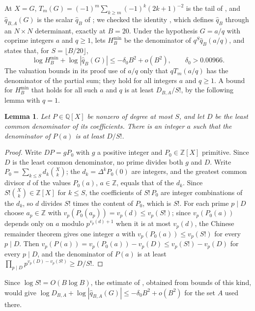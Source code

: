 \documentclass[11pt]{article}
\newtheorem{lemma}[theorem]{Lemma}
\theoremstyle{definition}
\begin{document}
At $X=G$, $T_m(G)=(-1)^m\sum_{k\ge m}(-1)^k(2k+1)^{-2}$ is the tail of \cite[(1.1)]{Sun}, and $\hat q_{B,A}(G)$ is the scalar $\hat q_B$ of \cite[(3.5)]{Sun}; we checked the identity \cite[Proposition~3.1]{Sun}, which defines $\hat q_B$ through an $N\times N$ determinant, exactly at $B=20$. Under the hypothesis $G=a/q$ with coprime integers $a$ and $q\ge1$, \cite[Definition~3.1]{Sun} lets $H_B^{\min}$ be the denominator of $q^S\hat q_B(a/q)$, and \cite[Theorem~9.1]{Sun} states that, for $S=\lfloor B/20\rfloor$,
\[
\log H_B^{\min}+\log|\hat q_B(G)|\le-\delta_0B^2+o(B^2),\qquad\delta_0>0.00966 .
\]
The valuation bounds in its proof \cite[Lemma~5.3]{Sun} use of $a/q$ only that $qT_m(a/q)$ has the denominator of the partial sum; they hold for all integers $a$ and $q\ge1$. A bound for $H_B^{\min}$ that holds for all such $a$ and $q$ is at least $D_{B,A}/S!$, by the following lemma with $q=1$.

\begin{lemma}\label{lem:sunfix}
Let $P\in\mathbb Q[X]$ be nonzero of degree at most $S$, and let $D$ be the least common denominator of its coefficients. There is an integer $a$ such that the denominator of $P(a)$ is at least $D/S!$.
\end{lemma}

\begin{proof}
Write $DP=gP_0$ with $g$ a positive integer and $P_0\in\mathbb Z[X]$ primitive. Since $D$ is the least common denominator, no prime divides both $g$ and $D$. Write $P_0=\sum_{k\le S}d_k\binom Xk$; the $d_k=\Delta^kP_0(0)$ are integers, and the greatest common divisor $d$ of the values $P_0(a)$, $a\in\mathbb Z$, equals that of the $d_k$. Since $S!\binom Xk\in\mathbb Z[X]$ for $k\le S$, the coefficients of $S!\,P_0$ are integer combinations of the $d_k$, so $d$ divides $S!$ times the content of $P_0$, which is $S!$. For each prime $p\mid D$ choose $a_p\in\mathbb Z$ with $v_p(P_0(a_p))=v_p(d)\le v_p(S!)$; since $v_p(P_0(a))$ depends only on $a$ modulo $p^{v_p(d)+1}$ when it is at most $v_p(d)$, the Chinese remainder theorem gives one integer $a$ with $v_p(P_0(a))\le v_p(S!)$ for every $p\mid D$. Then $v_p(P(a))=v_p(P_0(a))-v_p(D)\le v_p(S!)-v_p(D)$ for every $p\mid D$, and the denominator of $P(a)$ is at least $\prod_{p\mid D}p^{v_p(D)-v_p(S!)}\ge D/S!$.
\end{proof}

Since $\log S!=O(B\log B)$, the estimate of \cite[Theorem~9.1]{Sun}, obtained from bounds of this kind, would give $\log D_{B,A}+\log|\hat q_{B,A}(G)|\le-\delta_0B^2+o(B^2)$ for the set $A$ used there.
\end{document}
